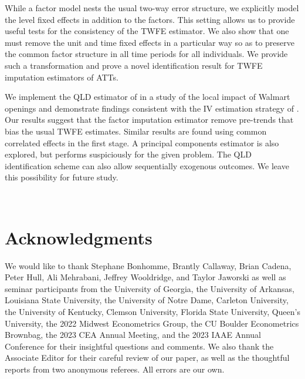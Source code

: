 \documentclass[12pt]{article}
\begin{document}
While a factor model nests the usual two-way error structure, we explicitly model the level fixed effects in addition to the factors. This setting allows us to provide useful tests for the consistency of the TWFE estimator. We also show that one must remove the unit and time fixed effects in a particular way so as to preserve the common factor structure in all time periods for all individuals. We provide such a transformation and prove a novel identification result for TWFE imputation estimators of ATTs.

We implement the QLD estimator of \citet{Ahn_Lee_Schmidt_2013} in a study of the local impact of Walmart openings and demonstrate findings consistent with the IV estimation strategy of \citet{basker2005job}. Our results suggest that the factor imputation estimator remove pre-trends that bias the usual TWFE estimates. Similar results are found using common correlated effects in the first stage. A principal components estimator is also explored, but performs suspiciously for the given problem. The QLD identification scheme can also allow sequentially exogenous outcomes. We leave this possibility for future study. 


\newpage~\section*{Acknowledgments}

We would like to thank Stephane Bonhomme, Brantly Callaway, Brian Cadena, Peter Hull, Ali Mehrabani, Jeffrey Wooldridge, and Taylor Jaworski as well as seminar participants from the University of Georgia, the University of Arkansas, Louisiana State University, the University of Notre Dame, Carleton University, the University of Kentucky, Clemson University, Florida State University, Queen's University, the 2022 Midwest Econometrics Group, the CU Boulder Econometrics Brownbag, the 2023 CEA Annual Meeting, and the 2023 IAAE Annual Conference for their insightful questions and comments. We also thank the Associate Editor for their careful review of our paper, as well as the thoughtful reports from two anonymous referees. All errors are our own.


\newpage~\appendix
\setcounter{table}{0}
\setcounter{figure}{0}
\renewcommand{\thetable}{\thesection\arabic{table}}
\renewcommand{\thefigure}{\thesection\arabic{figure}}
\end{document}
